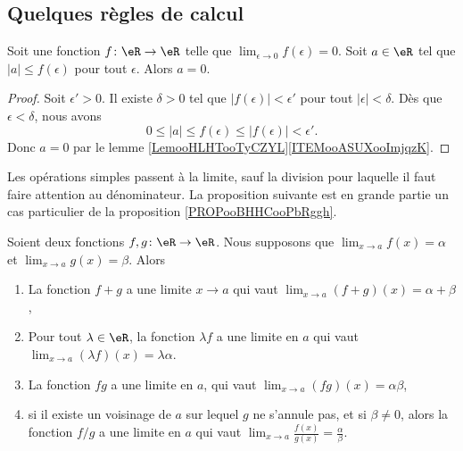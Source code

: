 \subsection{Quelques règles de calcul}

\begin{lemma}			\label{LEMooSPXNooPSufAn}
	Soit une fonction \(f \colon \eR\to \eR  \) telle que \( \lim_{\epsilon\to 0}f(\epsilon)=0\). Soit \( a\in \eR\) tel que \( | a |\leq f(\epsilon)\) pour tout \( \epsilon\). Alors \( a=0\).
\end{lemma}

\begin{proof}
	Soit \( \epsilon'>0\). Il existe \( \delta>0\) tel que  \( | f(\epsilon) |<\epsilon'\) pour tout \( | \epsilon |<\delta\). Dès que \( \epsilon<\delta\), nous avons
	\begin{equation}
		0\leq| a |\leq f(\epsilon)\leq | f(\epsilon) |<\epsilon'.
	\end{equation}
	Donc \( a=0\) par le lemme \ref{LemooHLHTooTyCZYL}\ref{ITEMooASUXooImjqzK}.
\end{proof}

Les opérations simples passent à la limite, sauf la division pour laquelle il faut faire attention au dénominateur. La proposition suivante est en grande partie un cas particulier de la proposition \ref{PROPooBHHCooPbRggh}.
\begin{proposition}     \label{PropOpsSimplesLimites}
	Soient deux fonctions \( f,g\colon \eR\to \eR\). Nous supposons que \( \lim_{x\to a} f(x)=\alpha\) et \( \lim_{x\to a} g(x)=\beta\). Alors
	\begin{enumerate}
		\item   \label{ITEMooOJUWooQpqqnQ}
		      La fonction \( f+g\) a une limite \( x\to a\) qui vaut \( \lim_{x\to a} (f+g)(x)=\alpha+\beta\),
		\item		\label{ITEMooNGWTooSDlEkp}
		      Pour tout \( \lambda\in \eR\), la fonction \( \lambda f\) a une limite en \( a\) qui vaut \( \lim_{x\to a}(\lambda f)(x)=\lambda \alpha\).
		\item
		      La fonction \( fg\) a une limite en \( a\), qui vaut \( \lim_{x\to a} (fg)(x)=\alpha\beta\),
		\item
		      si il existe un voisinage de \( a\) sur lequel \( g\) ne s'annule pas, et si \( \beta\neq 0\), alors la fonction \( f/g\) a une limite en \( a\) qui vaut \( \lim_{x\to a} \frac{ f(x) }{ g(x) }=\frac{ \alpha }{ \beta }\).
	\end{enumerate}
\end{proposition}

